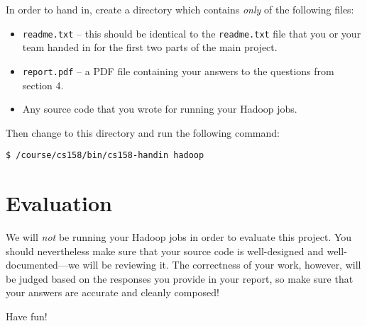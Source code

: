 \documentclass[10pt]{article}
\begin{document}
In order to hand in, create a directory which contains \textit{only} of the following files:
\begin{itemize}
\item \texttt{readme.txt} -- this should be identical to the \texttt{readme.txt}
file that you or your team handed in for the first two parts of the main project. 
\item \texttt{report.pdf} -- a PDF file containing your answers to the
questions from section 4.
\item Any source code that you wrote for running your Hadoop jobs.
\end{itemize}
Then change to this directory and run the following command:

\begin{verbatim}
$ /course/cs158/bin/cs158-handin hadoop
\end{verbatim}

\section{Evaluation}

We will \textit{not} be running your Hadoop jobs in order to evaluate
this project. You should nevertheless make sure that your source code is well-designed
and well-documented---we will be reviewing it. The correctness
of your work, however, will be judged based on the responses you provide in
your report, so make sure that your answers are accurate and
cleanly composed!

\begin{center}
	\large{Have fun!}
\end{center}
\end{document}
